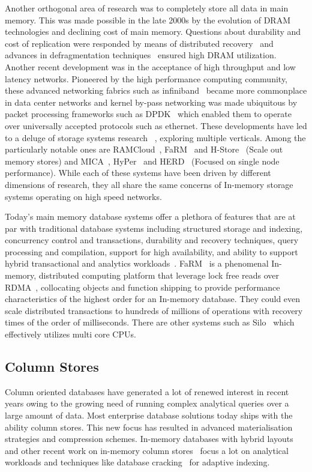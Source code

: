 Another orthogonal area of research was to completely store all data in main memory.
This was made possible in the late 2000s by the evolution of DRAM technologies and declining cost of main memory.
Questions about durability and cost of replication 
were responded by means of distributed recovery~\cite{ongaro2011fast} and advances in defragmentation techniques~\cite{ramcloudfast} 
ensured high DRAM utilization. Another recent development was in the acceptance of high throughput and low latency networks. 
Pioneered by the high performance computing community, these advanced networking fabrics 
such as infiniband~\cite{pfister2001introduction} became more commonplace in 
data center networks and kernel by-pass networking was made ubiquitous by packet processing 
frameworks such as DPDK~\cite{dpdk} which enabled them to operate over universally accepted protocols
such as ethernet. These developments have led to a deluge of storage systems research~\cite{mmdbmstutorial} ,
exploring multiple verticals. Among the particularly notable ones are RAMCloud~\cite{ramcloud},
FaRM~\cite{farm} and H-Store~\cite{hstore} (Scale out memory stores) and
MICA~\cite{mica}, HyPer~\cite{hyper} and HERD~\cite{herd} (Focused on single node performance).
While each of these systems have been driven by different dimensions 
of research, they all share the same concerns of In-memory storage systems 
operating on high speed networks.

Today's main memory database systems offer a plethora of features that are at par with traditional
database systems including structured storage and indexing, concurrency control and transactions,
 durability and recovery techniques, query processing and compilation, support for high availability, and 
ability to support hybrid transactional and analytics workloads~\cite{mmdbmstutorial}.
FaRM~\cite{farm} is a phenomenal In-memory, distributed computing platform that leverage lock free reads over RDMA~\cite{rdma},
collocating objects and function shipping to provide performance characteristics of the 
highest order for an In-memory database. They could even scale distributed transactions to
hundreds of millions of operations with recovery times of the order of milliseconds. There 
are other systems such as Silo~\cite{silo} which effectively utilizes multi core CPUs.

\subsection{Column Stores}
Column oriented databases have generated a lot of renewed interest in recent years owing to the growing 
need of running complex analytical queries over a large amount of data. Most enterprise 
database solutions today ships with the ability column stores. This new focus has resulted 
in advanced materialisation strategies and compression schemes\cite{cstore,cstorevsrowstore,cstore-material,cstorecompression}.
In-memory databases with hybrid layouts~\cite{hybridinmemorycolstore} and other recent work on in-memory column stores~\cite{inmemorycracking} 
focus a lot on analytical workloads and techniques like database cracking~\cite{databasecracking} for adaptive indexing.


